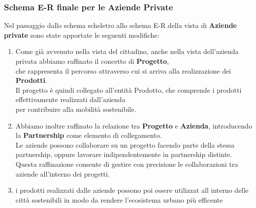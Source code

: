 \documentclass{article}
\begin{document}
\subsubsection{Schema E-R finale per le Aziende Private}
\begin{par}
    Nel passaggio dallo schema scheletro allo schema E-R della vista di \textbf{Aziende private} sono state apportate le seguenti modifiche:
    \begin{enumerate}
        \item Come già avvenuto nella vista del cittadino, anche nella vista dell’azienda privata abbiamo raffinato il concetto di \textbf{Progetto},\\
        che rappresenta il percorso attraverso cui si arriva alla realizzazione dei \textbf{Prodotti}.\\
        Il progetto è quindi collegato all’entità Prodotto, che comprende i prodotti effettivamente realizzati dall’azienda\\
        per contribuire alla mobilità sostenibile.
    
        \item Abbiamo inoltre raffinato la relazione tra \textbf{Progetto} e \textbf{Azienda}, introducendo la \textbf{Partnership} come elemento di collegamento.\\
        Le aziende possono collaborare su un progetto facendo parte della stessa partnership, oppure lavorare indipendentemente in partnership distinte.\\
        Questa raffinazione consente di gestire con precisione le collaborazioni tra aziende all’interno dei progetti.

        \item i prodotti realizzati dalle aziende possono poi essere utilizzat all interno delle città sostenibili in modo da rendere l'ecosistema urbano più efficente \\
    \end{enumerate}
    \end{par}
    
\end{document}
